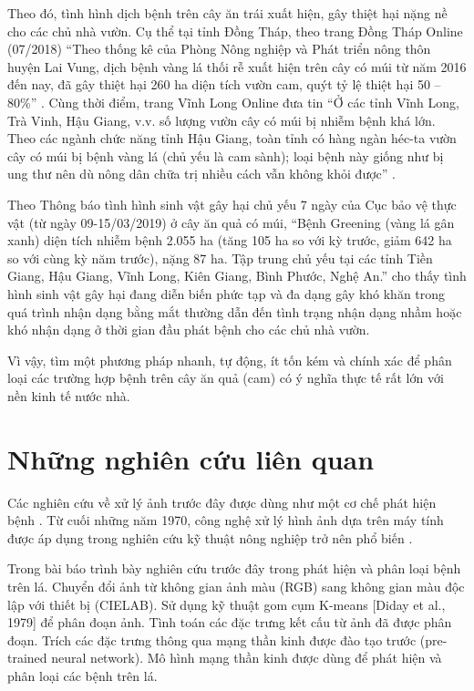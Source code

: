 Theo đó, tình hình dịch bệnh trên cây ăn trái xuất hiện, gây thiệt hại nặng nề cho các chủ nhà vườn. Cụ thể tại tỉnh Đồng Tháp, theo trang Đồng Tháp Online (07/2018) ``Theo thống kê của Phòng Nông nghiệp và Phát triển nông thôn huyện Lai Vung, dịch bệnh vàng lá thối rễ xuất hiện trên cây có múi từ năm 2016 đến nay, đã gây thiệt hại 260 ha diện tích vườn cam, quýt tỷ lệ thiệt hại 50 -- 80\%'' \cite{dongthaponline}. Cùng thời điểm, trang Vĩnh Long Online đưa tin ``Ở các tỉnh Vĩnh Long, Trà Vinh, Hậu Giang, v.v. số lượng vườn cây có múi bị nhiễm bệnh khá lớn. Theo các ngành chức năng tỉnh Hậu Giang, toàn tỉnh có hàng ngàn héc-ta vườn cây có múi bị bệnh vàng lá (chủ yếu là cam sành); loại bệnh này giống như bị ung thư nên dù nông dân chữa trị nhiều cách vẫn không khỏi được'' \cite{vinhlongonline}.\par

Theo Thông báo tình hình sinh vật gây hại chủ yếu 7 ngày của Cục bảo vệ thực vật (từ ngày 09-15/03/2019) ở cây ăn quả có múi, ``Bệnh Greening (vàng lá gân xanh) diện tích nhiễm bệnh 2.055 ha (tăng 105 ha so với kỳ trước, giảm 642 ha so với cùng kỳ năm trước), nặng 87 ha. Tập trung chủ yếu tại các tỉnh Tiền Giang, Hậu Giang, Vĩnh Long, Kiên Giang, Bình Phước, Nghệ An.'' cho thấy tình hình sinh vật gây hại đang diễn biến phức tạp và đa dạng gây khó khăn trong quá trình nhận dạng bằng mắt thường dẫn đến tình trạng nhận dạng nhầm hoặc khó nhận dạng ở thời gian đầu phát bệnh cho các chủ nhà vườn.\par 

Vì vậy, tìm một phương pháp nhanh, tự động, ít tốn kém và  chính xác để phân loại các trường hợp bệnh trên cây ăn quả (cam) có ý nghĩa thực tế rất lớn với nền kinh tế nước nhà.\par


\section{Những nghiên cứu liên quan}
Các nghiên cứu về xử lý ảnh trước đây được dùng như một cơ chế phát hiện bệnh \cite{weizheng2008grading}\cite{ei2004integrating}. Từ cuối những năm 1970, công nghệ xử lý hình ảnh dựa trên máy tính được áp dụng trong nghiên cứu kỹ thuật nông nghiệp trở nên phổ biến \cite{weizheng2008grading}\cite{moshashai2008identification}.

Trong bài báo \cite{al2011detection} trình bày nghiên cứu trước đây trong phát hiện và phân loại bệnh trên lá. Chuyển đổi ảnh từ không gian ảnh màu (RGB) sang không gian màu độc lập với thiết bị (CIELAB). Sử dụng kỹ thuật gom cụm K-means [Diday et al., 1979] để phân đoạn ảnh. Tình toán các đặc trưng kết cấu từ ảnh đã được phân đoạn. Trích các đặc trưng thông qua mạng thần kinh được đào tạo trước (pre-trained neural network). Mô hình mạng thần kinh được dùng để phát hiện và phân loại các bệnh trên lá.\par

